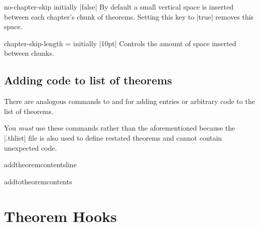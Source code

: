 \documentclass{ltxdoc}
\begin{document}
\begin{docKey}{no-chapter-skip}
  {}
  {initially |false|}
By default a small vertical space is inserted between each chapter's chunk of theorems. Setting this key to |true| removes this space.
\end{docKey}

\begin{docKey}{chapter-skip-length}
  {=}
  {initially |10pt|}
Controls the amount of space inserted between chunks.
\end{docKey}

\subsection{Adding code to list of theorems}

There are analogous commands to  and  for
adding entries or arbitrary code to the list of theorems.

\begin{notebox}
You \emph{must} use these commands rather than the aforementioned because the
|.thlist| file is also used to define restated theorems and cannot contain
unexpected code.
\end{notebox}

\begin{docCommand}{addtheoremcontentsline}
  {}

\end{docCommand}

\begin{docCommand}{addtotheoremcontents}
  {}

\end{docCommand}

\section{Theorem Hooks} \label{keythms-hooks}
\end{document}
